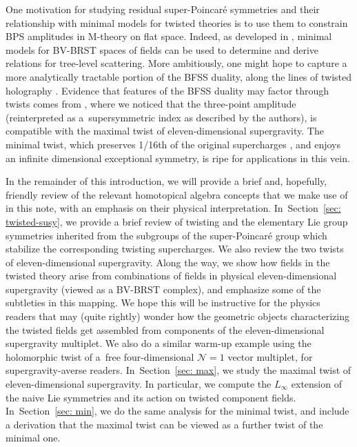 \documentclass[10pt,a4paper]{amsart}
\numberwithin{equation}{section}
\theoremstyle{definition}
\begin{document}
One motivation for studying residual super-Poincar\'e symmetries and their relationship with minimal models for twisted theories is to use them to constrain BPS amplitudes in M-theory on flat space. Indeed, as developed in \cite{perturbiner,Scattering-recursion}, minimal models for BV-BRST spaces of fields can be used to determine and derive relations for tree-level scattering. More ambitiously, one might hope to capture a more analytically tractable portion of the BFSS duality, along the lines of twisted holography \cite{ Costello:2018zrm,CostelloLi, Costello:2020jbh}. Evidence that features of the BFSS duality may factor through twists comes from \cite{MaldacenaHerderschee}, where we noticed that the three-point amplitude (reinterpreted as a~supersymmetric index as described by the authors), is compatible with the maximal twist of eleven-dimensional supergravity. The minimal twist, which preserves 1/16th of the original supercharges \cite{RSW}, and enjoys an infinite dimensional exceptional symmetry, is ripe for applications in this vein.

In the remainder of this introduction, we will provide a brief and, hopefully, friendly review of the relevant homotopical algebra concepts that we make use of in this note, with an emphasis on their physical interpretation. In~Section~\ref{sec: twisted-susy}, we provide a brief review of twisting and the elementary Lie group symmetries inherited from the subgroups of the super-Poincar\'e group which stabilize the corresponding twisting supercharges. We also review the two twists of eleven-dimensional supergravity. Along the way, we show how fields in the twisted theory arise from combinations of fields in physical eleven-dimensional supergravity (viewed as a BV-BRST complex), and emphasize some of the subtleties in this mapping. We hope this will be instructive for the physics readers that may (quite rightly) wonder how the geometric objects characterizing the twisted fields get assembled from components of the eleven-dimensional supergravity multiplet. We also do a similar warm-up example using the holomorphic twist of a~free four-dimensional $\mathcal{N}=1$ vector multiplet, for supergravity-averse readers. In~Section~\ref{sec: max}, we study the maximal twist of eleven-dimensional supergravity. In particular, we compute the $L_{\infty}$ extension of the naive Lie symmetries and its action on twisted component fields. In~Section~\ref{sec: min}, we do the same analysis for the minimal twist, and include a derivation that the maximal twist can be viewed as a further twist of the minimal one.
\end{document}
